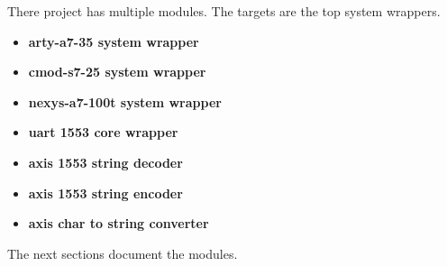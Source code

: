 \par
There project has multiple modules. The targets are the top system wrappers.

\begin{itemize}
\item \textbf{arty-a7-35 system wrapper}
\item \textbf{cmod-s7-25 system wrapper}
\item \textbf{nexys-a7-100t system wrapper}
\item \textbf{uart 1553 core wrapper}
\item \textbf{axis 1553 string decoder}
\item \textbf{axis 1553 string encoder}
\item \textbf{axis char to string converter}
\end{itemize}
The next sections document the modules.

